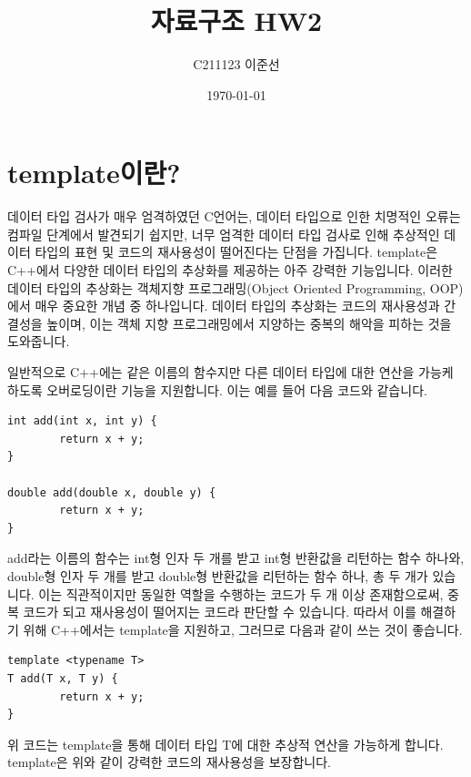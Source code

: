 \documentclass{article}
\title{자료구조 HW2}
\author{C211123 이준선}
\date{\today}
\begin{document}
\maketitle

\section{template이란?}
데이터 타입 검사가 매우 엄격하였던 C언어는, 데이터 타입으로 인한 치명적인 오류는 컴파일 단계에서 발견되기 쉽지만, 너무 엄격한 데이터 타입 검사로 인해 추상적인 데이터 타입의 표현 및 코드의 재사용성이 떨어진다는 단점을 가집니다.
template은 C++에서 다양한 데이터 타입의 추상화를 제공하는 아주 강력한 기능입니다. 이러한 데이터 타입의 추상화는 객체지향 프로그래밍(Object Oriented Programming, OOP)에서 매우 중요한 개념 중 하나입니다. 데이터 타입의 추상화는 코드의 재사용성과 간결성을 높이며, 이는 객체 지향 프로그래밍에서 지양하는 중복의 해악을 피하는 것을 도와줍니다.

일반적으로 C++에는 같은 이름의 함수지만 다른 데이터 타입에 대한 연산을 가능케 하도록 오버로딩이란 기능을 지원합니다. 이는 예를 들어 다음 코드와 같습니다.

\begin{verbatim}
int add(int x, int y) {
    	return x + y;
}

double add(double x, double y) {
	    return x + y;
}
\end{verbatim}

add라는 이름의 함수는 int형 인자 두 개를 받고 int형 반환값을 리턴하는 함수 하나와, double형 인자 두 개를 받고 double형 반환값을 리턴하는 함수 하나, 총 두 개가 있습니다. 이는 직관적이지만 동일한 역할을 수행하는 코드가 두 개 이상 존재함으로써, 중복 코드가 되고 재사용성이 떨어지는 코드라 판단할 수 있습니다. 따라서 이를 해결하기 위해 C++에서는 template을 지원하고, 그러므로 다음과 같이 쓰는 것이 좋습니다.
\begin{verbatim}
template <typename T>
T add(T x, T y) {
	    return x + y;
}
\end{verbatim}
위 코드는 template을 통해 데이터 타입 T에 대한 추상적 연산을 가능하게 합니다. template은 위와 같이 강력한 코드의 재사용성을 보장합니다.
\end{document}
